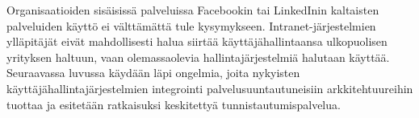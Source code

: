 Organisaatioiden sisäisissä palveluissa Facebookin tai LinkedInin kaltaisten palveluiden käyttö ei välttämättä tule kysymykseen. Intranet-järjestelmien ylläpitäjät eivät mahdollisesti halua siirtää käyttäjähallintaansa ulkopuolisen yrityksen haltuun, vaan olemassaolevia hallintajärjestelmiä halutaan käyttää. Seuraavassa luvussa käydään läpi ongelmia, joita nykyisten käyttäjähallintajärjestelmien integrointi palvelusuuntautuneisiin arkkitehtuureihin tuottaa ja esitetään ratkaisuksi keskitettyä tunnistautumispalvelua.